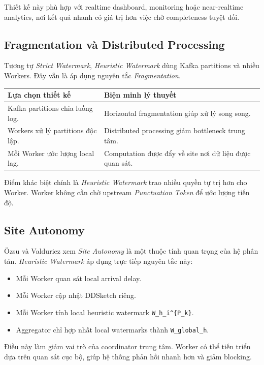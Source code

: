 \documentclass[12pt,a4paper]{article}
\begin{document}
Thiết kế này phù hợp với realtime dashboard, monitoring hoặc near-realtime analytics, nơi kết quả nhanh có giá trị hơn việc chờ completeness tuyệt đối.

\subsection{Fragmentation và Distributed Processing}

Tương tự \textit{Strict Watermark}, \textit{Heuristic Watermark} dùng Kafka partitions và nhiều Workers. Đây vẫn là áp dụng nguyên tắc \textit{Fragmentation}.

\begin{longtable}{p{} p{}}
\toprule
\textbf{Lựa chọn thiết kế} & \textbf{Biện minh lý thuyết} \\
\midrule
\endhead
Kafka partitions chia luồng log. & Horizontal fragmentation giúp xử lý song song. \\
Workers xử lý partitions độc lập. & Distributed processing giảm bottleneck trung tâm. \\
Mỗi Worker ước lượng local lag. & Computation được đẩy về site nơi dữ liệu được quan sát. \\
\bottomrule
\end{longtable}

Điểm khác biệt chính là \textit{Heuristic Watermark} trao nhiều quyền tự trị hơn cho Worker. Worker không cần chờ upstream \textit{Punctuation Token} để ước lượng tiến độ.

\subsection{Site Autonomy}

Özsu và Valduriez xem \textit{Site Autonomy} là một thuộc tính quan trọng của hệ phân tán. \textit{Heuristic Watermark} áp dụng trực tiếp nguyên tắc này:

\begin{itemize}
    \item Mỗi Worker quan sát local arrival delay.
    \item Mỗi Worker cập nhật DDSketch riêng.
    \item Mỗi Worker tính local heuristic watermark \texttt{W\_h\_i\textasciicircum\{P\_k\}}.
    \item Aggregator chỉ hợp nhất local watermarks thành \texttt{W\_global\_h}.
\end{itemize}

Điều này làm giảm vai trò của coordinator trung tâm. Worker có thể tiến triển dựa trên quan sát cục bộ, giúp hệ thống phản hồi nhanh hơn và giảm blocking.
\end{document}
